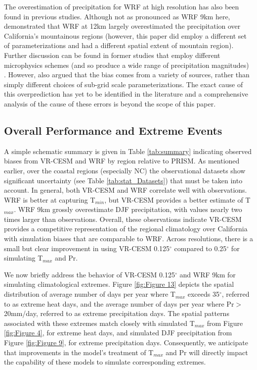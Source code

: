 \documentclass[ms,draft]{agutex}   %
\begin{document}
\begin{article}
The overestimation of precipitation for WRF at high resolution has also been found in previous studies. Although not as pronounced as WRF 9km here, \citet{caldwell2009evaluation} demonstrated that WRF at 12km largely overestimated the precipitation over California's mountainous regions (however, this paper did employ a different set of parameterizations and had a different spatial extent of mountain region). Further discussion can be found in former studies that employ different microphysics schemes (and so produce a wide range of precipitation magnitudes) \citep{jankov2005impact, chin2010preliminary, caldwell2010california}. However, \citet{caldwell2009evaluation} also argued that the bias comes from a variety of sources, rather than simply different choices of sub-grid scale parameterizations. The exact cause of this overprediction has yet to be identified in the literature and a comprehensive analysis of the cause of these errors is beyond the scope of this paper. 

\subsection{Overall Performance and Extreme Events}

A simple schematic summary is given in Table \ref{tab:summary} indicating observed biases from VR-CESM and WRF by region relative to PRISM. As mentioned earlier, over the coastal regions (especially NC) the observational datasets show significant uncertainty (see Table \ref{tab:stat_Datasets}) that must be taken into account. In general, both VR-CESM and WRF correlate well with observations. WRF is better at capturing T$_{min}$, but VR-CESM provides a better estimate of T$_{max}$.  WRF 9km grossly overestimate DJF precipitation, with values nearly two times larger than observations.  Overall, these observations indicate VR-CESM provides a competitive representation of the regional climatology over California with simulation biases that are comparable to WRF. Across resolutions, there is a small but clear improvement in using VR-CESM 0.125$^\circ$ compared to 0.25$^\circ$ for simulating T$_{max}$ and Pr.

We now briefly address the behavior of VR-CESM 0.125$^\circ$ and WRF 9km for simulating climatological extremes.  Figure \ref{fig:Figure 13} depicts the spatial distribution of average number of days per year where T$_{max}$ exceeds 35$^\circ$, referred to as extreme heat days, and the average number of days per year where Pr$>$20mm/day, referred to as extreme precipitation days.  The spatial patterns associated with these extremes match closely with simulated T$_{max}$ from Figure \ref{fig:Figure 4}, for extreme heat days, and simulated DJF precipitation from Figure \ref{fig:Figure 9}, for extreme precipitation days.  Consequently, we anticipate that improvements in the model's treatment of T$_{max}$ and Pr will directly impact the capability of these models to simulate corresponding extremes.


\end{article}
\end{document}
